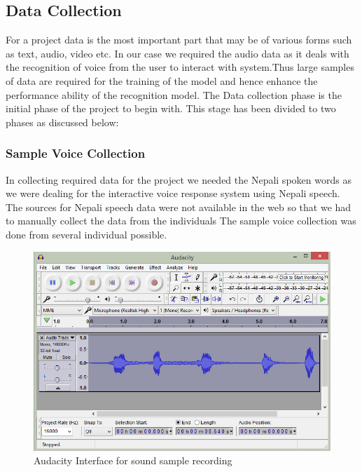 \subsection{Data Collection}
For a project data is the most important part that may be of various forms such as text, audio, video etc. In our case we required the audio data
as it deals with the recognition of voice from the user to interact with 
system.Thus large samples of data are required for the training of the 
model and hence enhance the performance ability of the recognition model.
The Data collection phase is the initial phase of the project to 
begin with. This stage has been divided to two phases as discussed below:

\subsubsection{Sample Voice Collection}
In collecting required data for the project we needed the Nepali spoken 
words as we were dealing for the interactive voice response system
using Nepali speech. The sources for Nepali speech data were not available
in the web so that we had to manually collect the data from the individuals
The sample voice collection was done from several individual possible.
\begin{figure}[h]
	\begin{center}
		\includegraphics[scale=0.7]{images/audacity.png}
		\caption{Audacity Interface for sound sample recording}
		\label{audacity}
	\end{center}
\end{figure}


